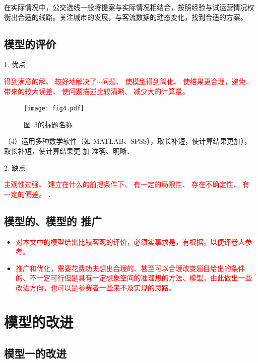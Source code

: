 \documentclass[12pt,a4paper]{mcmthesis}
\begin{document}
    在实际情况中，公交选线一般将提案与实际情况相结合，按照经验与试运营情况权衡出合适的线路。关注城市的发展，与客流数据的动态变化，找到合适的方案。

    \subsection{模型的评价}


    1. 优点

    \textcolor{red}{得到满意的解、
    较好地解决了$\cdots$问题、
    使模型得到简化、
    使结果更合理，避免…带来的较大误差、
    使问题描述比较清晰、
    减少大的计算量。}



    \begin{figure}[h!t]
        \centerline{\texttt{[image: fig4.pdf]}}
        \caption{\song\wuhao 图~3的标题名称}
    \end{figure}


    （4）运用多种数学软件（如 MATLAB、SPSS），取长补短，使计算结果更加），取长补短，使计算结果更
    加 准确、明晰．

    2. 缺点

    \textcolor{red}{主观性过强、
    建立在什么的前提条件下、
    有一定的局限性、
    存在不确定性、
    有一定的偏差。
    }
    ．

    \subsection{模型的、模型的 推广}

    \begin{itemize}

        \item \textcolor{red}{对本文中的模型给出比较客观的评价，必须实事求是，有根据，以便评卷人参考。}

        \item \textcolor{red}{推广和优化，需要花费功夫想出合理的、甚至可以合理改变题目给出的条件的、不一定可行但是具有一定想象空间的准理想的方法、模型。由此做出一些改进方向，也可以是参赛者一些来不及实现的思路。}
    \end{itemize}


    \section{模型的改进}

    \subsection{模型一的改进}
\end{document}
